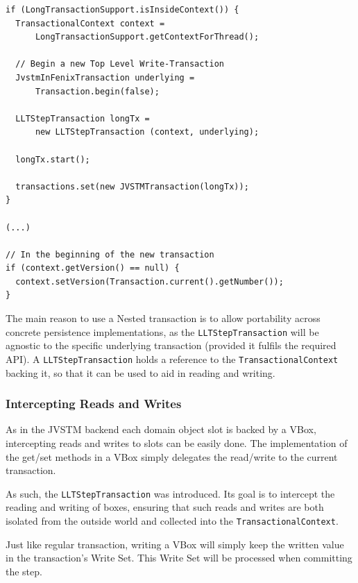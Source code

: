 \begin{lstlisting}[caption={Beginning a new Long Lived Transaction
    step}, float]
if (LongTransactionSupport.isInsideContext()) {
  TransactionalContext context = 
      LongTransactionSupport.getContextForThread();

  // Begin a new Top Level Write-Transaction
  JvstmInFenixTransaction underlying =
      Transaction.begin(false);

  LLTStepTransaction longTx = 
      new LLTStepTransaction (context, underlying);

  longTx.start();

  transactions.set(new JVSTMTransaction(longTx));
}

(...)

// In the beginning of the new transaction
if (context.getVersion() == null) {
  context.setVersion(Transaction.current().getNumber());
}
\end{lstlisting}

The main reason to use a Nested transaction is to allow portability
across concrete persistence implementations, as the
\texttt{LLTStepTransaction} will be agnostic to the specific
underlying transaction (provided it fulfils the required API). A
\texttt{LLTStepTransaction} holds a reference to the
\texttt{TransactionalContext} backing it, so that it can be used to
aid in reading and writing.

\subsubsection{Intercepting Reads and Writes}

As in the JVSTM backend each domain object slot is backed by a VBox,
intercepting reads and writes to slots can be easily done. The
implementation of the get/set methods in a VBox simply delegates the
read/write to the current transaction.

As such, the \texttt{LLTStepTransaction} was introduced. Its goal is
to intercept the reading and writing of boxes, ensuring that such
reads and writes are both isolated from the outside world and
collected into the \texttt{TransactionalContext}.

Just like regular transaction, writing a VBox will simply keep the
written value in the transaction's Write Set. This Write Set will be
processed when committing the step. 

